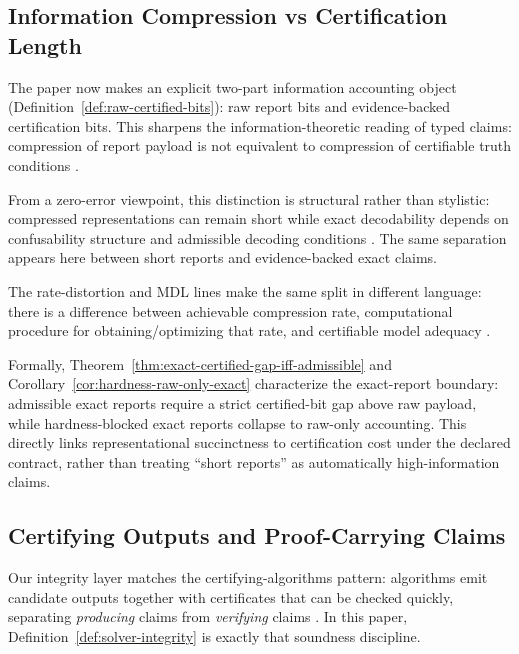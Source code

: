 \subsection{Information Compression vs Certification Length}

The paper now makes an explicit two-part information accounting object (Definition~\ref{def:raw-certified-bits}): raw report bits and evidence-backed certification bits. This sharpens the information-theoretic reading of typed claims: compression of report payload is not equivalent to compression of certifiable truth conditions \cite{shannon1948mathematical,cover2006elements,slepian1973noiseless}.

From a zero-error viewpoint, this distinction is structural rather than stylistic: compressed representations can remain short while exact decodability depends on confusability structure and admissible decoding conditions \cite{shannon1956zero,korner1973graphs,lovasz1979shannon,csiszar2011information}. The same separation appears here between short reports and evidence-backed exact claims.

The rate-distortion and MDL lines make the same split in different language: there is a difference between achievable compression rate, computational procedure for obtaining/optimizing that rate, and certifiable model adequacy \cite{shannon1959coding,blahut1972computation,rissanen1978modeling,grunwald2007minimum,li2008introduction}.

Formally, Theorem~\ref{thm:exact-certified-gap-iff-admissible} and Corollary~\ref{cor:hardness-raw-only-exact} characterize the exact-report boundary: admissible exact reports require a strict certified-bit gap above raw payload, while hardness-blocked exact reports collapse to raw-only accounting. This directly links representational succinctness to certification cost under the declared contract, rather than treating ``short reports'' as automatically high-information claims.

\subsection{Certifying Outputs and Proof-Carrying Claims}

Our integrity layer matches the certifying-algorithms pattern: algorithms emit candidate outputs together with certificates that can be checked quickly, separating \emph{producing} claims from \emph{verifying} claims \cite{mcconnell2010certifying,necula1997proof}. In this paper, Definition~\ref{def:solver-integrity} is exactly that soundness discipline.

